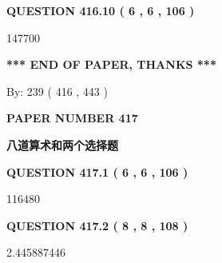 \documentclass{ctexart}
\begin{document}
\vspace{0.2in}
  
{\textbf{\Large{QUESTION
416.10 
 ( 6 , 6 , 106 )
}}}
  
  
 
 
\noindent{}

147700
 
 
   
   
 \vspace{0.2in}
 
   
   
   
   
\vspace{1.0in} 
{\textbf{\large{ *** END OF PAPER, THANKS *** }}} 
   
   
\hspace{1.0in} By: 
 239 ( 416 ,  443 )
   
   
   
   
\newpage 
\setcounter{page}{ 
   417001 } 
   
   
   
   
 {\textbf{ \Large{ PAPER NUMBER  417  }}}
   
   
\vspace{0.2in}
   
   
   
   
   
   
 \vspace{0.2in}
{\LARGE {\textbf{ 八道算术和两个选择题}}}
   
   
  
\vspace{0.2in}
  
{\textbf{\Large{QUESTION
417.1 
 ( 6 , 6 , 106 )
}}}
  
  
 
 
\noindent{}

116480
 
 
  
\vspace{0.2in}
  
{\textbf{\Large{QUESTION
417.2 
 ( 8 , 8 , 108 )
}}}
  
  
 
 
\noindent{}

2.445887446
 
\end{document}
